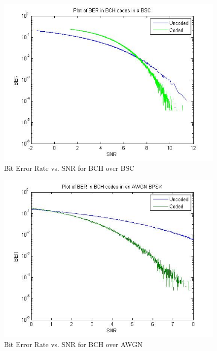 \documentclass[a4paper]{article}
\begin{document}
\begin{figure}[H]
\centering
\includegraphics[scale=0.5]{plotBER_BSC_SNR.jpg}
\caption{Bit Error Rate vs. SNR for BCH over BSC}
\end{figure}

\begin{figure}[H]
\centering
\includegraphics[scale=0.5]{plotBER_AWGN.jpg} 
\caption{Bit Error Rate vs. SNR for BCH over AWGN}
\end{figure}
\end{document}
